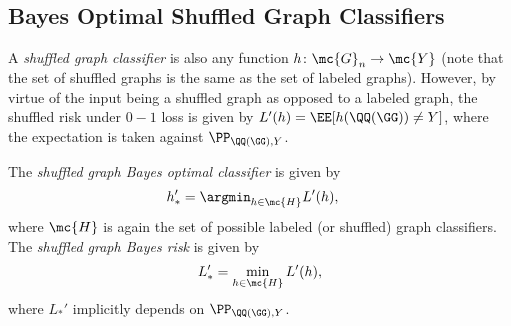 \documentclass[10pt,journal,cspaper,compsoc]{IEEEtran}
\begin{document}

\subsection{Bayes Optimal Shuffled Graph Classifiers} %

A \emph{shuffled graph classifier} is also any function $h\colon \mc{G}_n \to \mc{Y}$ (note that the set of shuffled graphs is the same as the set of labeled graphs). However, by virtue of the input being a shuffled graph as opposed to a labeled graph, the shuffled risk under $0-1$ loss is given by $L'(h)=\EE[h(\QQ(\GG)) \neq Y]$, where the expectation is taken against $\PP_{\QQ(\GG),Y}$. %

The \emph{shuffled graph Bayes optimal classifier} is given by
\begin{align}
	h_*' &= \argmin_{h \in \mc{H}} L'(h), %
\end{align}
where $\mc{H}$ is again the set of possible labeled (or shuffled) graph classifiers. The \emph{shuffled graph Bayes risk} is given by
\begin{align}
	L_*' =\min_{h \in \mc{H}} L'(h),
\end{align}
where  $L_*'$ implicitly depends on $\PP_{\QQ(\GG),Y}$.  %
\end{document}
